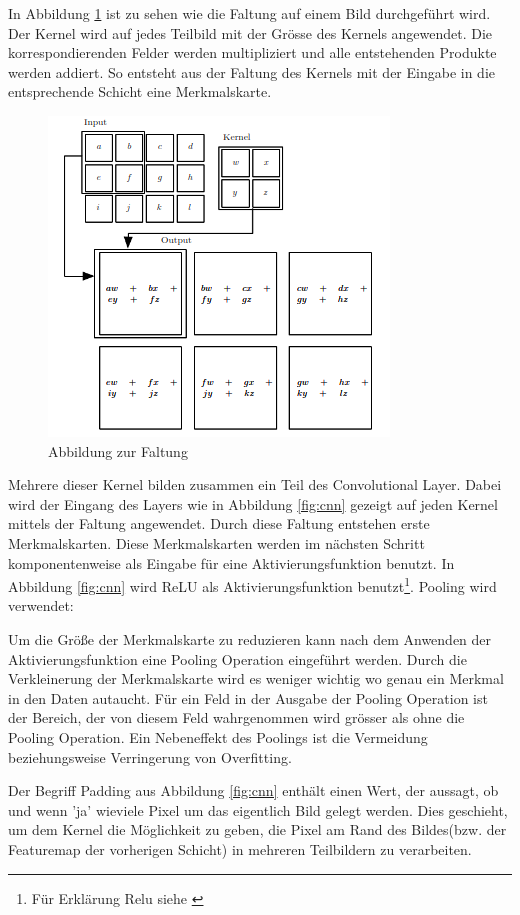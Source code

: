 In Abbildung \ref{fig:faltung} ist zu sehen wie die Faltung auf einem Bild durchgeführt wird. Der Kernel wird auf jedes Teilbild mit der Grösse des Kernels angewendet. Die korrespondierenden Felder werden multipliziert und alle entstehenden Produkte werden addiert. So entsteht aus der Faltung des Kernels mit der Eingabe in die entsprechende Schicht eine Merkmalskarte.
\begin{figure}[H]
 \centering
 \includegraphics[width=0.45 \textwidth,keepaspectratio=true]{images/convolution.png}
 \caption{Abbildung zur Faltung \cite{CNNBook}}
 \label{fig:faltung}
\end{figure}
Mehrere dieser Kernel bilden zusammen ein Teil des Convolutional Layer. Dabei wird der Eingang des Layers wie in Abbildung \ref{fig:cnn} gezeigt auf jeden Kernel mittels der Faltung angewendet. Durch diese Faltung entstehen erste Merkmalskarten. Diese Merkmalskarten werden im nächsten Schritt komponentenweise als Eingabe für eine Aktivierungsfunktion benutzt. In Abbildung \ref{fig:cnn} wird ReLU als Aktivierungsfunktion benutzt\footnote{Für Erklärung Relu siehe \cite{neural}}. Pooling wird verwendet:

Um die Größe der Merkmalskarte zu reduzieren kann nach dem Anwenden der Aktivierungsfunktion eine Pooling Operation eingeführt werden. Durch die Verkleinerung der Merkmalskarte wird es weniger wichtig wo genau ein Merkmal in den Daten autaucht. Für ein Feld in der Ausgabe der Pooling Operation ist der Bereich, der von diesem Feld wahrgenommen wird grösser als ohne die Pooling Operation. Ein Nebeneffekt des Poolings ist die Vermeidung beziehungsweise Verringerung von Overfitting. 


Der Begriff Padding aus Abbildung \ref{fig:cnn} enthält einen Wert, der aussagt, ob und wenn 'ja' wieviele Pixel um das eigentlich Bild gelegt werden. Dies geschieht, um dem Kernel die Möglichkeit zu geben, die Pixel am Rand des Bildes(bzw. der Featuremap der vorherigen Schicht) in mehreren Teilbildern zu verarbeiten.



